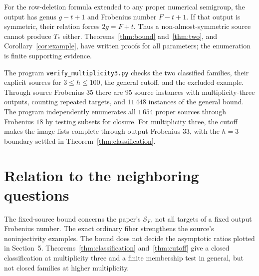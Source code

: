 \documentclass[11pt,a4paper]{article}
\theoremstyle{definition}
\theoremstyle{remark}
\begin{document}
For the row-deletion formula extended to any proper numerical semigroup,
the output has genus $g-t+1$ and Frobenius number $F-t+1$.
If that output is symmetric, their relation forces $2g=F+t$.
Thus a non-almost-symmetric source cannot produce $T_*$ either.
Theorems~\ref{thm:bound} and~\ref{thm:two}, and Corollary~\ref{cor:example}, have written
proofs for all parameters; the enumeration is finite supporting evidence.

The program \texttt{verify\_multiplicity3.py} checks the two classified
families, their explicit sources for $3\leq h\leq100$, the general cutoff,
and the excluded example. Through source Frobenius $35$ there are $95$
source instances with multiplicity-three outputs, counting repeated targets,
and $11\,448$ instances of the general bound. The program independently
enumerates all $1\,654$ proper sources through Frobenius $18$ by testing
subsets for closure. For multiplicity three, the cutoff makes the image
lists complete through output Frobenius $33$, with the $h=3$ boundary
settled in Theorem~\ref{thm:classification}.

\section{Relation to the neighboring questions}
The fixed-source bound concerns the paper's $\mathcal S_F$, not all targets
of a fixed output Frobenius number. The exact ordinary fiber strengthens
the source's noninjectivity examples. The bound does not decide the asymptotic ratios plotted in Section~5. Theorems~\ref{thm:classification} and~\ref{thm:cutoff} give a closed classification at multiplicity three and a finite membership test in general, but not closed families at higher multiplicity.
\end{document}
